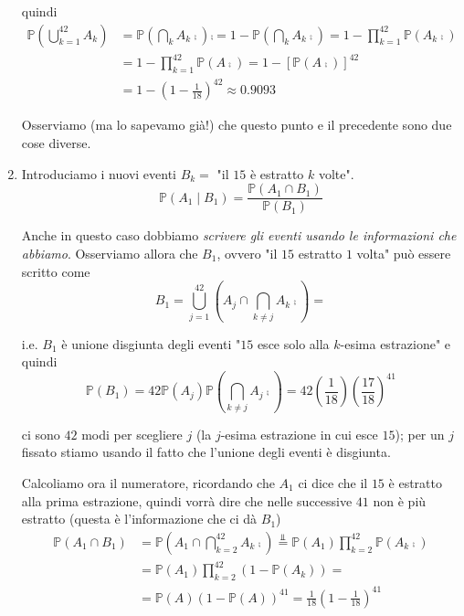\begin{enumerate}
quindi\begin{equation*}
\begin{aligned}
\mathbb{P}\left(\bigcup _{k=1}^{42} A_{k}\right) & =\mathbb{P}\left(\bigcap _{k} A_{k}\comp\right)\comp =1-\mathbb{P}\left(\bigcap _{k} A_{k}\comp\right) =1-\prod _{k=1}^{42}\mathbb{P}\left( A_{k}\comp\right)\\
 & =1-\prod _{k=1}^{42}\mathbb{P}\left( A\comp\right) =1-\left[\mathbb{P}\left( A\comp\right)\right]^{42}\\
 & =1-\left( 1-\frac{1}{18}\right)^{42} \approx 0.9093
\end{aligned}
\end{equation*}

\begin{oss}
Osserviamo (ma lo sapevamo già!) che questo punto e il precedente sono due cose diverse.
\end{oss}
\item Introduciamo i nuovi eventi $B_{k} =$ "il $15$ è estratto $k$ volte".\begin{equation*}
\mathbb{P}( A_{1} \mid B_{1}) =\frac{\mathbb{P}( A_{1} \cap B_{1})}{\mathbb{P}( B_{1})}
\end{equation*}

Anche in questo caso dobbiamo \textit{scrivere gli eventi usando le informazioni che abbiamo}. Osserviamo allora che $B_{1}$, ovvero "il $15$ estratto $1$ volta" può essere scritto come\begin{equation*}
B_{1} =\bigcup _{j=1}^{42}\left( A_{j} \cap \bigcap _{k\neq j} A_{k}\comp\right) =
\end{equation*}

i.e. $B_{1}$ è unione disgiunta degli eventi "$15$ esce solo alla $k$-esima estrazione" e quindi\begin{equation*}
\mathbb{P}( B_{1}) =42\mathbb{P}( A_{j})\mathbb{P}\left(\bigcap _{k\neq j} A_{j}\comp\right) =42\left(\frac{1}{18}\right)\left(\frac{17}{18}\right)^{41}
\end{equation*}

ci sono $42$ modi per scegliere $j$ (la $j$-esima estrazione in cui esce $15$); per un $j$ fissato stiamo usando il fatto che l'unione degli eventi è disgiunta.

Calcoliamo ora il numeratore, ricordando che $A_{1}$ ci dice che il $15$ è estratto alla prima estrazione, quindi vorrà dire che nelle successive $41$ non è più estratto (questa è l'informazione che ci dà $B_{1}$)\begin{equation*}
\begin{aligned}
\mathbb{P}( A_{1} \cap B_{1}) & =\mathbb{P}\left( A_{1} \cap \bigcap _{k=2}^{42} A_{k}\comp\right)\overset{\Bot }{=}\mathbb{P}( A_{1})\prod _{k=2}^{42}\mathbb{P}\left( A_{k}\comp\right)\\
 & =\mathbb{P}( A_{1})\prod _{k=2}^{42}( 1-\mathbb{P}( A_{k})) =\\
 & =\mathbb{P}( A)( 1-\mathbb{P}( A))^{41} =\frac{1}{18}\left( 1-\frac{1}{18}\right)^{41}
\end{aligned}
\end{equation*}


\end{enumerate}

